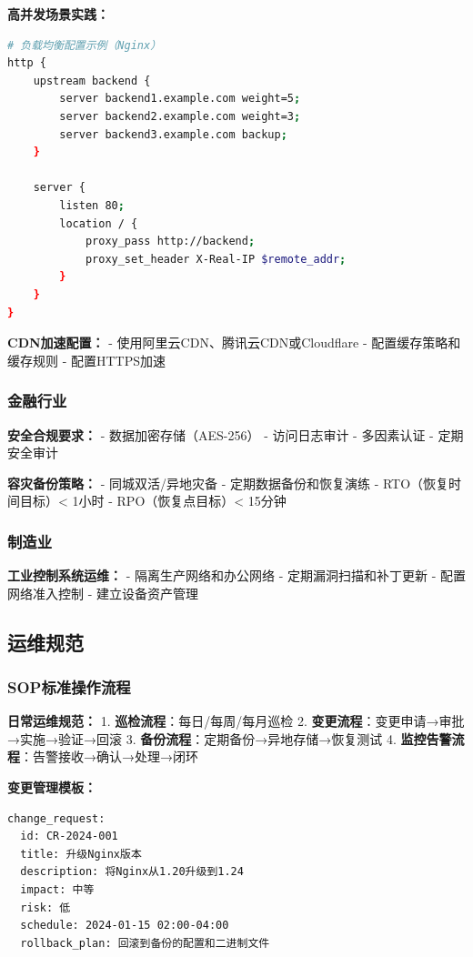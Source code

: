 \documentclass[12pt,UTF8]{ctexbook}
\begin{document}
\textbf{高并发场景实践：}
\begin{lstlisting}[language=bash]
# 负载均衡配置示例（Nginx）
http {
    upstream backend {
        server backend1.example.com weight=5;
        server backend2.example.com weight=3;
        server backend3.example.com backup;
    }
    
    server {
        listen 80;
        location / {
            proxy_pass http://backend;
            proxy_set_header X-Real-IP $remote_addr;
        }
    }
}
\end{lstlisting}

\textbf{CDN加速配置：}
- 使用阿里云CDN、腾讯云CDN或Cloudflare
- 配置缓存策略和缓存规则
- 配置HTTPS加速

\subsubsection*{金融行业}

\textbf{安全合规要求：}
- 数据加密存储（AES-256）
- 访问日志审计
- 多因素认证
- 定期安全审计

\textbf{容灾备份策略：}
- 同城双活/异地灾备
- 定期数据备份和恢复演练
- RTO（恢复时间目标）< 1小时
- RPO（恢复点目标）< 15分钟

\subsubsection*{制造业}

\textbf{工业控制系统运维：}
- 隔离生产网络和办公网络
- 定期漏洞扫描和补丁更新
- 配置网络准入控制
- 建立设备资产管理

\subsection*{运维规范}

\subsubsection*{SOP标准操作流程}

\textbf{日常运维规范：}
1. \textbf{巡检流程}：每日/每周/每月巡检
2. \textbf{变更流程}：变更申请→审批→实施→验证→回滚
3. \textbf{备份流程}：定期备份→异地存储→恢复测试
4. \textbf{监控告警流程}：告警接收→确认→处理→闭环

\textbf{变更管理模板：}
\begin{lstlisting}
change_request:
  id: CR-2024-001
  title: 升级Nginx版本
  description: 将Nginx从1.20升级到1.24
  impact: 中等
  risk: 低
  schedule: 2024-01-15 02:00-04:00
  rollback_plan: 回滚到备份的配置和二进制文件
\end{lstlisting}
\end{document}
